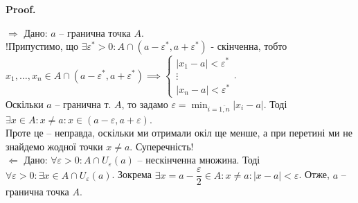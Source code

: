 \documentclass[a4paper, 14pt]{article}
\makeatletter
\def\qed{$\blacksquare$}
\def\rightproof{$\boxed{\Rightarrow}$ }
\def\leftproof{$\boxed{\Leftarrow}$ }
\theoremstyle{theoremdd}
\theoremstyle{theoremdd}
\theoremstyle{theoremdd}
\theoremstyle{theoremdd}
\theoremstyle{theoremdd}
\theoremstyle{theoremdd}
\theoremstyle{theoremdd}
\theoremstyle{theoremdd}
\renewenvironment{proof}[1][Proof.\\]{\par
\pushQED{\hfill \qed}%
\normalfont \topsep6\p@\@plus6\p@\relax
\trivlist
\item\relax
{\bfseries
#1\@addpunct{.}}\hspace\labelsep\ignorespaces
}{%
\popQED\endtrivlist\@endpefalse
}
\makeatother
\begin{document}
\begin{proof}
\rightproof Дано: $a$ -- гранична точка $A$.\\
!Припустимо, що $\exists \varepsilon^* > 0: A \cap (a-\varepsilon^*,a+\varepsilon^*)$ - скінченна, тобто\\
$x_1,\dots,x_n \in A \cap (a-\varepsilon^*,a+\varepsilon^*) \implies \begin{cases} |x_1-a| < \varepsilon^* \\ \vdots \\ |x_n-a| < \varepsilon^* \end{cases}$.\\
Оскільки $a$ -- гранична т. $A$, то задамо $\varepsilon = \displaystyle\min_{i = \overline{1,n}} |x_i-a|$. Тоді $\exists x \in A: x \neq a: x \in (a-\varepsilon,a+\varepsilon)$.\\
Проте це -- неправда, оскільки ми отримали окіл ще менше, а при перетині ми не знайдемо жодної точки $x \neq a$. Суперечність!
\bigskip \\
\leftproof Дано: $\forall \varepsilon > 0: A \cap U_{\varepsilon}(a)$ -- нескінченна множина. Тоді $\forall \varepsilon > 0: \exists x \in A \cap U_{\varepsilon}(a)$. Зокрема $\exists x = a - \dfrac{\varepsilon}{2} \in A: x \neq a: |x-a| < \varepsilon$. Отже, $a$ -- гранична точка $A$.
\end{proof}
\end{document}
